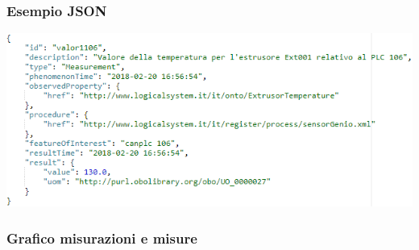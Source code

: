 \documentclass{beamer}
\begin{document}

\begin{frame}
\frametitle{Esempio JSON}
\includegraphics[width=1\textwidth]{images/TemperatureJSON.png}
\end{frame}

%
%

\begin{frame}
\frametitle{Grafico misurazioni e misure}
\begin{figure}%
{}%
\hfill
{}%
%
%
\end{figure}
\end{frame}
\end{document}
